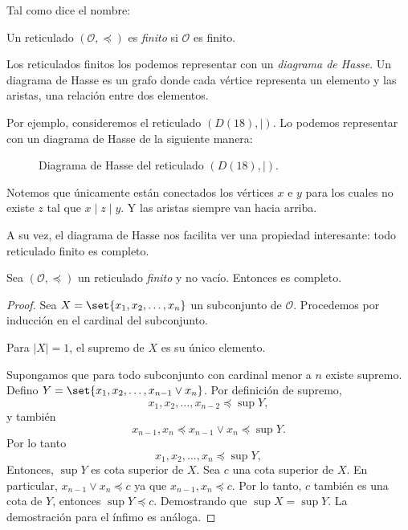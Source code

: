 Tal como dice el nombre:

\begin{definition}
    Un reticulado $(\mathcal{O}, \preceq)$ es \emph{finito} si $\mathcal{O}$ es finito.
\end{definition}

Los reticulados finitos los podemos representar con un \textit{diagrama de Hasse}. Un diagrama de Hasse es un grafo donde cada vértice representa un elemento y las aristas, una relación entre dos elementos.

Por ejemplo, consideremos el reticulado $(D(18), \mid)$. Lo podemos representar con un diagrama de Hasse de la siguiente manera:

\begin{figure}
    \centering
    \caption{Diagrama de Hasse del reticulado $(D(18), \mid)$.}
\end{figure}

Notemos que únicamente están conectados los vértices $x$ e $y$ para los cuales no existe $z$ tal que $x \mid z \mid y$. Y las aristas siempre van hacia arriba.

A su vez, el diagrama de Hasse nos facilita ver una propiedad interesante: todo reticulado finito es completo.

\begin{proposition}
    Sea $(\mathcal{O}, \preceq)$ un reticulado \textit{finito} y no vacío. Entonces es completo.
\end{proposition}

\begin{proof}
    Sea $X = \set{ x_{1}, x_{2}, \dots, x_{n} }$ un subconjunto de $\mathcal{O}$. Procedemos por inducción en el cardinal del subconjunto. 

    Para $\lvert X \rvert = 1$, el supremo de $X$ es su único elemento.

    Supongamos que para todo subconjunto con cardinal menor a $n$ existe supremo. Defino $Y = \set{ x_{1}, x_{2}, \dots, x_{n-1} \vee x_{n} }$. Por definición de supremo,
    $$
        x_{1}, x_{2}, \dots, x_{n-2} \preceq \sup Y,
    $$
    y también
    $$
    x_{n-1}, x_{n} \preceq x_{n-1} \vee x_{n} \preceq \sup Y.
    $$
    Por lo tanto
    $$
        x_{1}, x_{2}, \dots, x_{n} \preceq \sup Y,
    $$
    Entonces, $\sup Y$ es cota superior de $X$. Sea $c$ una cota superior de $X$. En particular, $x_{n-1} \vee x_{n} \preceq c$ ya que $x_{n-1}, x_{n} \preceq c$. Por lo tanto, $c$ también es una cota de $Y$, entonces $\sup Y \preceq c$. Demostrando que $\sup X = \sup Y$. La demostración para el ínfimo es análoga.
\end{proof}

